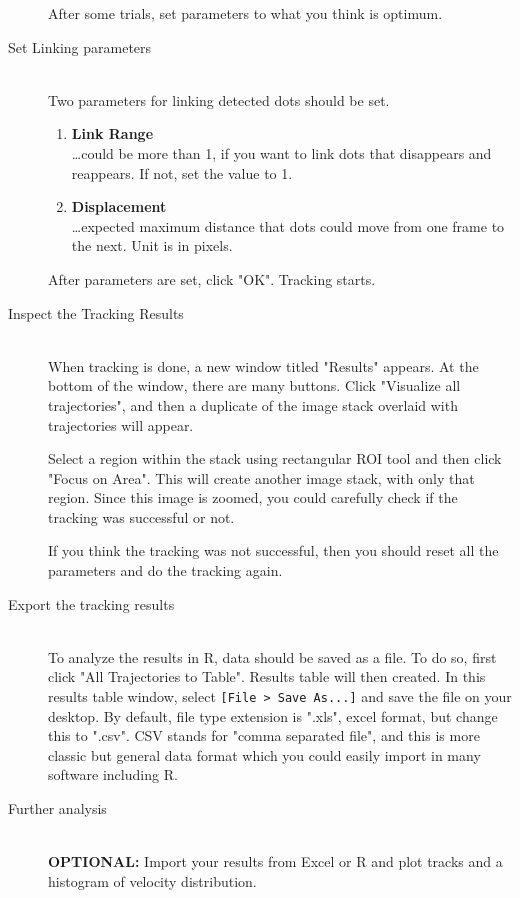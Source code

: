 \documentclass[11pnt]{article}
\begin{document}
\begin{description}
After some trials, set parameters to what you think is optimum. 

\item[Set Linking parameters]\hfill\\

Two parameters for linking detected dots should be set. 
\begin{enumerate}
\item \textbf{Link Range}\hfill\\
\dots could be more than 1, if you want to link dots that disappears and reappears. If not, set the value to 1.
\item \textbf{Displacement}\hfill\\
\dots expected maximum distance that dots could move from one frame to the next. Unit is in pixels. 
\end{enumerate}
After parameters are set, click "OK". Tracking starts. 

\item[Inspect the Tracking Results]\hfill\\

When tracking is done, a new window titled "Results" appears. At the bottom of the window, there are many buttons. Click "Visualize all trajectories", and then a duplicate of the image stack overlaid with trajectories will appear. 

Select a region within the stack using rectangular ROI tool and then click "Focus on Area". This will create another image stack, with only that region. Since this image is zoomed, you could carefully check if the tracking was successful or not. 

If you think the tracking was not successful, then you should reset all the parameters and do the tracking again.

\item[Export the tracking results]\hfill\\

To analyze the results in R, data should be saved as a file. To do so, first click "All Trajectories to Table". Results table will then created. In this results table window, select \verb"[File > Save As...]" and save the file on your desktop. By default, file type extension is ".xls", excel format, but change this to ".csv". CSV stands for "comma separated file", and this is more classic but general data format which you could easily import in many software including R.  


\item [Further analysis] \hfill\\

\textbf{OPTIONAL:} Import your results from Excel or R and plot tracks and a histogram of velocity distribution.

\end{description}
\end{document}
